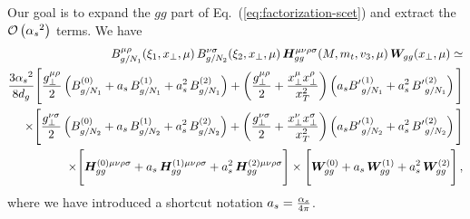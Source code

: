 \documentclass[a4paper,11pt]{report}
\numberwithin{equation}{section}
\begin{document}
Our goal is to expand the $gg$ part of Eq.~(\ref{eq:factorization-scet}) and
extract the ${{\cal O}\left({\alpha_s}^2\right)}$ terms. We have
%
\begin{align}
  B^{\mu\rho}_{g/N_1}(\xi_1,x_\perp,\mu) \,
  B^{\nu\sigma}_{g/N_2}(\xi_2,x_\perp,\mu) \, 
  \bm{H}^{\mu\nu\rho\sigma}_{gg}(M,m_t,v_3,\mu) \, \bm{W}_{gg}(x_\perp,\mu)
  \simeq \nonumber \\
  \frac{3{\alpha_s}^2}{8 d_g}
  \Bigg[\frac{g_\perp^{\mu\rho}}{2} 
  \left(B_{g/N_1}^{(0)} +a_s\, B_{g/N_1}^{(1)}+a_s^2\, B_{g/N_1}^{(2)} \right) +
  \left(\frac{g_\perp^{\mu\rho}}{2}+
  \frac{x_\perp^\mu x_\perp^\rho}{x_T^2}\right) 
  \left(a_s {B'}_{g/N_1}^{(1)} + a_s^2\, {B'}_{g/N_1}^{(2)}\right)
  \Bigg]
  \nonumber \\
  \times
  \Bigg[\frac{g_\perp^{\nu\sigma}}{2} 
  \left(B_{g/N_2}^{(0)}+a_s\, B_{g/N_2}^{(1)}+a_s^2\, B_{g/N_2}^{(2)} \right) +
  \left(\frac{g_\perp^{\nu\sigma}}{2}+
        \frac{x_\perp^\nu x_\perp^\sigma}{x_T^2}\right)
  \left(a_s {B'}_{g/N_2}^{(1)} + a_s^2\, {B'}_{g/N_2}^{(2)}\right)
  \Bigg]
  \nonumber \\
  \times
  \Bigg[
  \bm{H}^{(0) \mu\nu\rho\sigma}_{gg} + 
  a_s\, \bm{H}^{(1) \mu\nu\rho\sigma}_{gg} +
  a_s^2\, \bm{H}^{(2) \mu\nu\rho\sigma}_{gg}
  \Bigg]
  \times
  \Bigg[
  \bm{W}^{(0)}_{gg} + a_s\, \bm{W}^{(1)}_{gg} + a_s^2\, \bm{W}^{(2)}_{gg}
  \Bigg]\,,
\end{align}
%
where we have introduced a shortcut notation $a_s = \frac{{\alpha_s}}{4\pi}$.
 
\end{document}
